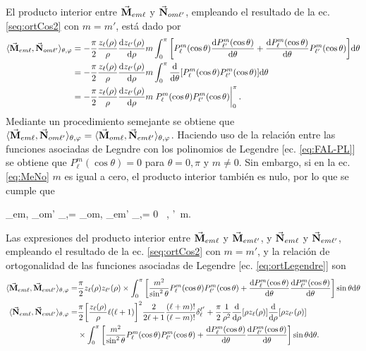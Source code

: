  El producto interior entre $\va{M}_{em\ell}$ y $\va{N}_{om\ell'}$, empleando el resultado de la ec. \eqref{seq:ortCos2} con $m=m'$, está dado por
	\begin{align}
		\langle\va{M}_{em\ell},  \va{N}_{om\ell'} \rangle_{\theta,\varphi} &= - \frac{\pi}{2} \frac{z_\ell (\rho)}{\rho}\dv{z_{\ell'}(\rho)}{\rho}	m
							 \int_0^\pi\qty[P_\ell^m(\cos \theta )\dv{P_{\ell'}^m(\cos \theta )}{\theta}+ 
							  \dv{P_{\ell}^m(\cos \theta )}{\theta}P_{\ell'}^m(\cos \theta )] \dd\theta \notag\\
					 &=- \frac{\pi}{2} \frac{z_\ell (\rho)}{\rho}\dv{z_{\ell'}(\rho)}{\rho}	m 
					 	\int_0^\pi \dv{\theta}\qty[P_\ell^m(\cos\theta)P_{\ell'}^m(\cos\theta)]\dd\theta \notag\\
					 &=- \frac{\pi}{2} \frac{z_\ell (\rho)}{\rho}\dv{z_{\ell'}(\rho)}{\rho}	m \eval{P_\ell^m(\cos\theta)P_{\ell'}^m(\cos\theta)}_0^\pi.
					 	\label{eq:MeNo}
	\end{align}
Mediante un procedimiento semejante se obtiene que $\langle\va{M}_{em\ell},  \va{N}_{om\ell'} \rangle_{\theta,\varphi}=\langle\va{M}_{om\ell},  \va{N}_{em\ell'} \rangle_{\theta,\varphi}$. Haciendo uso de la relación entre las funciones asociadas de Legndre con los polinomios de Legendre [ec. \eqref{eq:FAL-PL}] se obtiene que $P_\ell^m(\cos\theta)=0$ para $\theta=0,\pi$ y $m\neq 0$. Sin embargo, si en la ec. \eqref{eq:MeNo} $m$ es igual a cero, el producto interior también es nulo, por lo que se cumple que 
	\begin{tcolorbox}
		\langle{}_{em\ell},  _{om\ell'} \rangle_{\theta,\varphi}=
		\langle{}_{om\ell},  _{em\ell'} \rangle_{\theta,\varphi}= 0	
		\qquad \forall\, \ell, \ell'\, m.
	\end{tcolorbox}
Las expresiones del  producto interior entre $\va{M}_{em\ell}$ y $\va{M}_{em\ell'}$, y $\va{N}_{em\ell}$ y $\va{N}_{em\ell'}$, empleando el resultado de la ec. \eqref{seq:ortCos2} con $m=m'$, y la relación de ortogonalidad de las funciones asociadas de Legendre [ec. \eqref{eq:ortLegendre}] son
	\begin{align*}
		\langle\va{M}_{em\ell},  \va{M}_{em\ell'} \rangle_{\theta,\varphi} =& 
				\frac{\pi}{2} z_\ell (\rho) z_{\ell'}(\rho)\times	 \int_0^\pi\qty[\frac{m^2}{\sin^2\theta}P_\ell^m(\cos\theta)P_{\ell'}^m(\cos\theta)
				 +\dv{P_\ell^m(\cos\theta)}{\theta}\dv{P_{\ell'}^m(\cos\theta)}{\theta}]\sin\theta\dd\theta\\
		\langle\va{N}_{em\ell},  \va{N}_{em\ell'} \rangle_{\theta,\varphi} =&
				\frac{\pi}{2} \qty[\frac{z_\ell(\rho)}{\rho}\ell(\ell+1)]^2\frac{2}{2\ell+1}\frac{(\ell+m)!}{(\ell-m)!}\delta_\ell^{\ell'}+
				\frac{\pi}{2} \frac{1}{\rho^2}\dv{\rho}\qty[\rho z_\ell (\rho)]\dv{\rho}\qty[\rho z_{\ell'}(\rho)]\\
				&\times \int_0^\pi\qty[\frac{m^2}{\sin^2\theta}P_\ell^m(\cos\theta)P_{\ell'}^m(\cos\theta)
					+\dv{P_\ell^m(\cos\theta)}{\theta}\dv{P_{\ell'}^m(\cos\theta)}{\theta}]\sin\theta\dd\theta.				 
	\end{align*}
